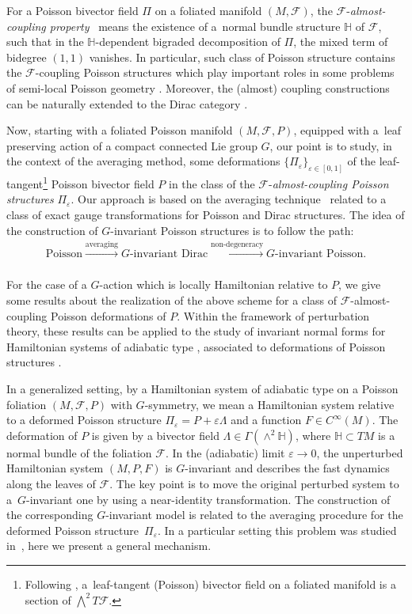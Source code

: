 \documentclass[pdftex]{sigma}
\numberwithin{equation}{section}
\begin{document}
For a Poisson bivector f\/ield $\Pi$ on a foliated manifold $(M,\mathcal{F})$, the $\mathcal{F}$-\textit{almost-coupling proper\-ty}~\cite{Va-04} means the existence of a~normal bundle structure $\mathbb{H}$ of $\mathcal{F}$, such that in the $\mathbb{H}$-dependent bigraded decomposition of $\Pi$, the mixed term of bidegree $(1,1)$ vanishes. In particular, such class of Poisson structure contains the $\mathcal{F}$-coupling Poisson structures which play important roles in some problems of semi-local Poisson geometry \cite{CrFe,CrMa-12,Va-04, Vo-01}. Moreover, the (almost) coupling constructions can be naturally extended to the Dirac category \cite{BrF, Va-06,Wa}.

Now, starting with a foliated Poisson manifold $(M,\mathcal{F},P)$, equipped with a~leaf preserving action of a compact connected Lie group $G$, our point is to study, in the context of the averaging method, some deformations $\{\Pi_{\varepsilon }\}_{\varepsilon\in [0,1]}$ of the leaf-tangent\footnote{Following \cite{Va-06}, a~leaf-tangent (Poisson) bivector f\/ield on a foliated manifold is a section of $\bigwedge^2 T\mathcal{F}$.} Poisson bivector f\/ield $P$ in the class of the $\mathcal{F}$-\textit{almost-coupling Poisson structures} $\Pi_{\varepsilon}$. Our approach is based on the averaging technique~\cite{JVYV-14} related to a class of exact gauge transformations for Poisson and Dirac structures. The idea of the construction of $G$-invariant Poisson structures is to follow the path:
\begin{gather*}
\text{Poisson}\xrightarrow[]{\text{averaging}}G\text{-invariant Dirac}\xrightarrow[]{\text{non-degeneracy}}G\text{-invariant Poisson}.
\end{gather*}

For the case of a $G$-action which is locally Hamiltonian relative to $P$, we give some results about the realization of the above scheme for a class of $\mathcal{F}$-almost-coupling Poisson deformations of $P$. Within the framework of perturbation theory, these results can be applied to the study of invariant normal forms for Hamiltonian systems of adiabatic type \cite{ArKN-88}, associated to deformations of Poisson structures \cite{MJYu-13,MYU-16}.

In a generalized setting, by a Hamiltonian system of adiabatic type on a Poisson foliation $(M,\mathcal{F},P)$ with $G$-symmetry, we mean a Hamiltonian system relative to a deformed Poisson structure $\Pi_{\varepsilon}=P+\varepsilon \Lambda$ and a function $F\in C^{\infty}(M)$. The deformation of $P$ is given by a bivector f\/ield $\Lambda\in\Gamma(\wedge^{2}\mathbb{H})$, where $\mathbb{H}\subset TM$ is a normal bundle of the foliation $\mathcal{F}$. In the (adiabatic) limit $\varepsilon\to 0$, the unperturbed Hamiltonian system $(M,P,F)$ is $G$-invariant and describes the fast dynamics along the leaves of $\mathcal{F}$. The key point is to move the original perturbed system to a~$G$-invariant one by using a near-identity transformation. The construction of the corresponding $G$-invariant model is related to the averaging procedure for the deformed Poisson structure~$\Pi_{\varepsilon}$. In a particular setting this problem was studied in~\cite{MYU-16}, here we present a general mechanism.
\end{document}
